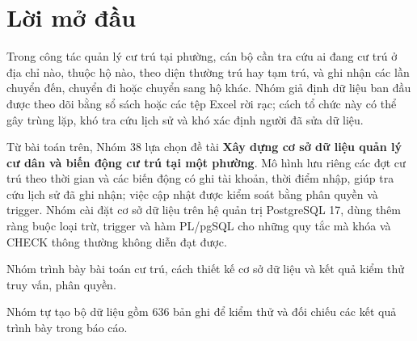\section*{Lời mở đầu}
\vspace{10pt}
\fontsize{14pt}{21pt}\selectfont

Trong công tác quản lý cư trú tại phường, cán bộ cần tra cứu ai đang cư trú ở địa chỉ nào, thuộc hộ nào, theo diện thường trú hay tạm trú, và ghi nhận các lần chuyển đến, chuyển đi hoặc chuyển sang hộ khác. Nhóm giả định dữ liệu ban đầu được theo dõi bằng sổ sách hoặc các tệp Excel rời rạc; cách tổ chức này có thể gây trùng lặp, khó tra cứu lịch sử và khó xác định người đã sửa dữ liệu.

Từ bài toán trên, Nhóm 38 lựa chọn đề tài \textbf{Xây dựng cơ sở dữ liệu quản lý cư dân và biến động cư trú tại một phường}. Mô hình lưu riêng các đợt cư trú theo thời gian và các biến động có ghi tài khoản, thời điểm nhập, giúp tra cứu lịch sử đã ghi nhận; việc cập nhật được kiểm soát bằng phân quyền và trigger. Nhóm cài đặt cơ sở dữ liệu trên hệ quản trị PostgreSQL 17, dùng thêm ràng buộc loại trừ, trigger và hàm PL/pgSQL cho những quy tắc mà khóa và CHECK thông thường không diễn đạt được.

Nhóm trình bày bài toán cư trú, cách thiết kế cơ sở dữ liệu và kết quả kiểm thử truy vấn, phân quyền.

Nhóm tự tạo bộ dữ liệu gồm 636 bản ghi để kiểm thử và đối chiếu các kết quả trình bày trong báo cáo.
